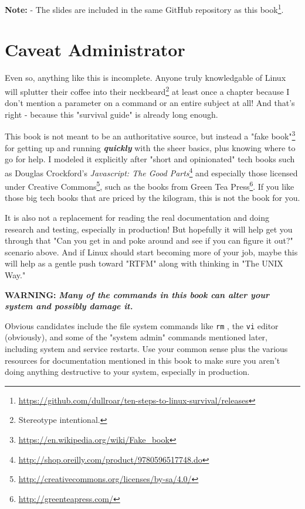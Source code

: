 \documentclass[10pt,american,]{book}
\makeatletter
\renewcommand{\href}[2]{#2\footnote{\url{#1}}}
\numberwithin{figure}{chapter}
\DeclareRobustCommand{\drcmd}[1]{\index{Commands!#1@\texttt{#1}}}
\makeatother
\begin{document}
\textbf{Note:} - The slides are included in
\href{https://github.com/dullroar/ten-steps-to-linux-survival/releases}{the
same GitHub repository as this book}.

\section*{Caveat Administrator}\label{caveat-administrator}

Even so, anything like this is incomplete. Anyone truly knowledgable of
Linux will splutter their coffee into their neckbeard\footnote{Stereotype
  intentional.} at least once a chapter because I don't mention a
parameter on a command or an entire subject at all! And that's right -
because this "survival guide" is already long enough.

This book is not meant to be an authoritative source, but instead a
\href{https://en.wikipedia.org/wiki/Fake_book}{"fake book"} for getting
up and running \textbf{\emph{quickly}} with the sheer basics, plus
knowing where to go for help. I modeled it explicitly after "short and
opinionated" tech books such as Douglas Crockford's
\href{http://shop.oreilly.com/product/9780596517748.do}{\emph{Javascript:
The Good Parts}} and especially those licensed under
\href{http://creativecommons.org/licenses/by-sa/4.0/}{Creative Commons},
such as the books from \href{http://greenteapress.com/}{Green Tea
Press}. If you like those big tech books that are priced by the
kilogram, this is not the book for you.

It is also not a replacement for reading the real documentation and
doing research and testing, especially in production! But hopefully it
will help get you through that "Can you get in and poke around and see
if you can figure it out?" scenario above. And if Linux should start
becoming more of your job, maybe this will help as a gentle push toward
"RTFM" along with thinking in "The UNIX Way."

\textbf{WARNING:} \textbf{\emph{Many of the commands in this book can
alter your system and possibly damage it.}}

Obvious candidates include the file system commands like
\texttt{rm}\drcmd{rm} , the
\texttt{vi}\drcmd{vi} editor (obviously), and
some of the "system admin" commands mentioned later, including system
and service restarts. Use your common sense plus the various resources
for documentation mentioned in this book to make sure you aren't doing
anything destructive to your system, especially in production.
\end{document}
